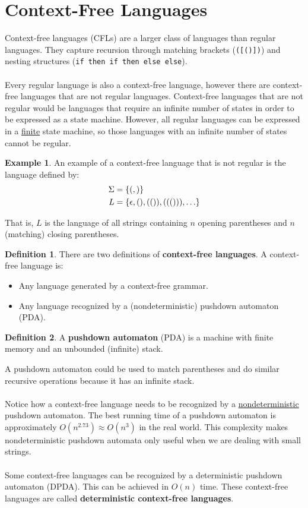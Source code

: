 \documentclass[]{article}
\DeclarePairedDelimiter{\set}{\lbrace}{\rbrace}
\theoremstyle{definition}
\newtheorem*{defn}{Definition}
\newtheorem{ex}{Example}[section]
\newcommand{\lecture}[1]{\marginpar{{\footnotesize $\leftarrow$ \underline{#1}}}}
\begin{document}
	\section{Context-Free Languages} \lecture{February 25, 2013}
		Context-free languages (CFLs) are a larger class of languages than regular languages. They capture recursion through matching brackets (\verb+([()])+) and nesting structures (\verb+if then if then else else+).
		\\ \\
		Every regular language is also a context-free language, however there are context-free languages that are not regular languages. Context-free languages that are not regular would be languages that require an infinite number of states in order to be expressed as a state machine. However, all regular languages can be expressed in a \underline{finite} state machine, so those languages with an infinite number of states cannot be regular.
		\begin{ex}
			An example of a context-free language that is not regular is the language defined by:
			\begin{align*}
				\Sigma &= \set{(, )} \\
				L &= \set{\epsilon, (), (()), ((())), \ldots}
			\end{align*}

			That is, $L$ is the language of all strings containing $n$ opening parentheses and $n$ (matching) closing parentheses.
		\end{ex}
		
		\begin{defn}
			There are two definitions of \textbf{context-free languages}. A context-free language is:
			\begin{itemize}
				\item Any language generated by a context-free grammar.
				\item Any language recognized by a (nondeterministic) pushdown automaton (PDA).
			\end{itemize}
		\end{defn}

		\begin{defn}
			A \textbf{pushdown automaton} (PDA) is a machine with finite memory and an unbounded (infinite) stack.
		\end{defn}

		A pushdown automaton could be used to match parentheses and do similar recursive operations because it has an infinite stack.
		\\ \\
		Notice how a context-free language needs to be recognized by a \underline{nondeterministic} pushdown automaton. The best running time of a pushdown automaton is approximately $O(n^{2.73}) \approx O(n^3)$ in the real world. This complexity makes nondeterministic pushdown automata only useful when we are dealing with small strings.
		\\ \\
		Some context-free languages can be recognized by a deterministic pushdown automaton (DPDA). This can be achieved in $O(n)$ time. These context-free languages are called \textbf{deterministic context-free languages}.
\end{document}

